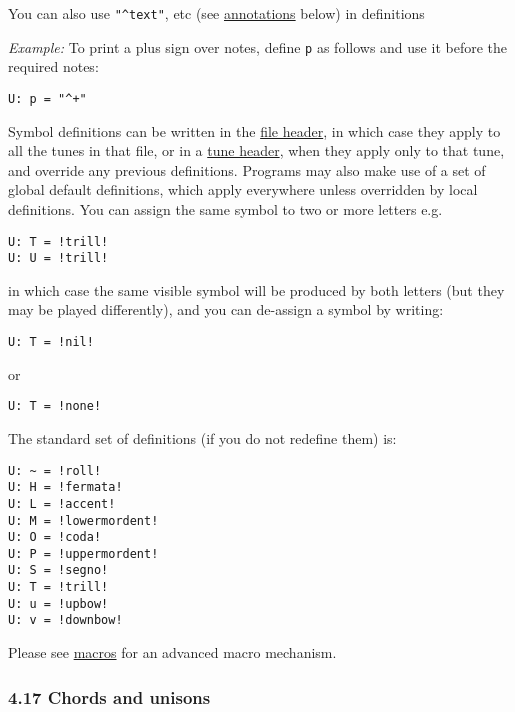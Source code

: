 You can also use \texttt{"\^{}text"}, etc (see
\protect\hyperlink{annotations}{annotations} below) in definitions

\emph{Example:} To print a plus sign over notes, define \texttt{p} as
follows and use it before the required notes:

\begin{verbatim}
U: p = "^+"
\end{verbatim}

Symbol definitions can be written in the
\protect\hyperlink{file_header_definition}{file header}, in which case
they apply to all the tunes in that file, or in a
\protect\hyperlink{tune_header_definition}{tune header}, when they apply
only to that tune, and override any previous definitions. Programs may
also make use of a set of global default definitions, which apply
everywhere unless overridden by local definitions. You can assign the
same symbol to two or more letters e.g.

\begin{verbatim}
U: T = !trill!
U: U = !trill!
\end{verbatim}

in which case the same visible symbol will be produced by both letters
(but they may be played differently), and you can de-assign a symbol by
writing:

\begin{verbatim}
U: T = !nil!
\end{verbatim}

or

\begin{verbatim}
U: T = !none!
\end{verbatim}

The standard set of definitions (if you do not redefine them) is:

\begin{verbatim}
U: ~ = !roll!
U: H = !fermata!
U: L = !accent!
U: M = !lowermordent!
U: O = !coda!
U: P = !uppermordent!
U: S = !segno!
U: T = !trill!
U: u = !upbow!
U: v = !downbow!
\end{verbatim}

Please see \protect\hyperlink{macros}{macros} for an advanced macro
mechanism.

\hypertarget{chords_and_unisons}{\subsubsection{4.17 Chords and
unisons}\label{chords_and_unisons}}

